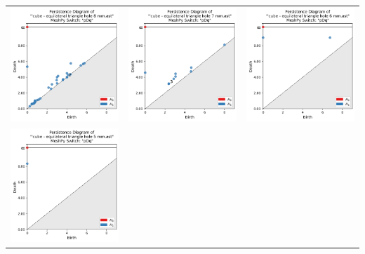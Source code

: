 \documentclass[ma]{uncgdissertationexp}
\theoremstyle{plain}
\theoremstyle{definition}
\theoremstyle{remark}
\begin{document}
\begin{table}[H]
\begin{center}
    \begin{tabular}{ccc}
         \includegraphics[width=1.875in]{Final Run, (cube - equilateral triangle hole 8 mm) persdia.png} &
         \includegraphics[width=1.875in]{Final Run, (cube - equilateral triangle hole 7 mm) persdia.png} &  
         \includegraphics[width=1.875in]{Final Run, (cube - equilateral triangle hole 6 mm) persdia.png} \\
         \includegraphics[width=1.875in]{Final Run, (cube - equilateral triangle hole 5 mm) persdia.png} & 

\end{tabular}
\end{center}
\end{table}
\end{document}

